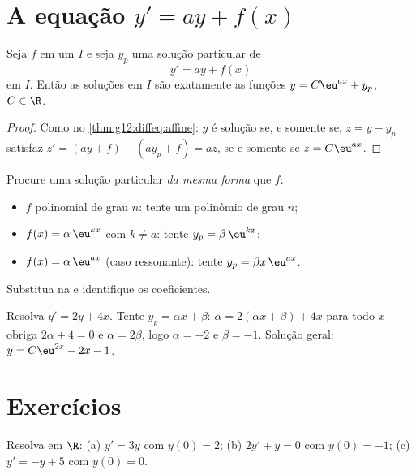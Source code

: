 \section{A equação \texorpdfstring{$y' = ay + f(x)$}{y' = ay + f(x)}}

\begin{proposition}\label{prop:g12:diffeq:general}
Seja $f$  em um  $I$ e seja $y_p$ uma solução particular
de
\[
y' = ay + f(x)
\]
em $I$. Então as soluções em $I$ são exatamente as funções
$y = C\eu^{ax} + y_p$, $C \in \R$.
\end{proposition}

\begin{proof}
Como no \cref{thm:g12:diffeq:affine}: $y$ é solução se, e somente se,
$z = y - y_p$ satisfaz $z' = (ay + f) - (ay_p + f) = az$, se e somente se
$z = C\eu^{ax}$.
\end{proof}

\begin{method}\label{met:g12:diffeq:particular}
Procure uma solução particular \emph{da mesma forma} que $f$:
\begin{itemize}
  \item $f$ polinomial de grau $n$: tente um polinômio de grau $n$;
  \item $f(x) = \alpha\,\eu^{kx}$ com $k \neq a$: tente
        $y_p = \beta\,\eu^{kx}$;
  \item $f(x) = \alpha\,\eu^{ax}$ (caso ressonante): tente
        $y_p = \beta x\,\eu^{ax}$.
\end{itemize}
Substitua na  e identifique os coeficientes.
\end{method}

\begin{example}\label{ex:g12:diffeq:particular}
Resolva $y' = 2y + 4x$. Tente $y_p = \alpha x + \beta$:
$\alpha = 2(\alpha x + \beta) + 4x$ para todo $x$ obriga
$2\alpha + 4 = 0$ e $\alpha = 2\beta$, logo $\alpha = -2$ e $\beta = -1$.
Solução geral: $y = C\eu^{2x} - 2x - 1$.
\end{example}

\section{Exercícios}

\begin{exercise}[$\star$]\label{exo:g12:diffeq:1}
Resolva em $\R$:
(a) $y' = 3y$ com $y(0) = 2$;\quad
(b) $2y' + y = 0$ com $y(0) = -1$;\quad
(c) $y' = -y + 5$ com $y(0) = 0$.
\end{exercise}

